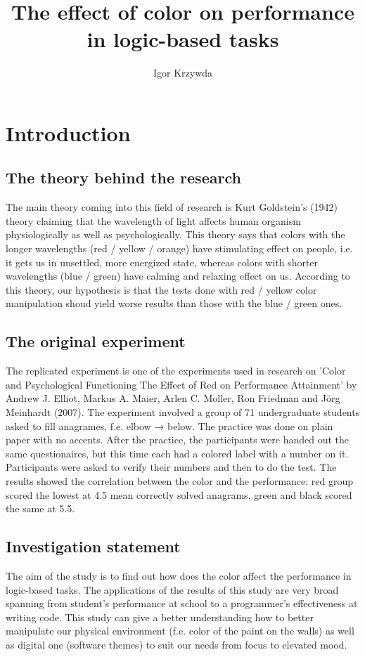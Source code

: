 \documentclass{article}
\title{The effect of color on performance in logic-based tasks}
\author{Igor Krzywda}
\begin{document}
\maketitle

\section*{Introduction}

\subsection*{The theory behind the research}
	The main theory coming into this field of research is Kurt Goldstein's (1942) theory claiming that
	the wavelength of light affects human organism physiologically as well as psychologically. This theory
	says that colors with the longer wavelengths (red / yellow / orange) have stimulating effect on people, 
	i.e. it gets us in unsettled, more energized state, whereas colors with shorter wavelengths (blue / green)
	have calming and relaxing effect on us. According to this theory, our hypothesis is that the tests done
	with red / yellow color manipulation shoud yield worse results than those with the blue / green ones.

\subsection*{The original experiment}
	The replicated experiment is one of the experiments used in research on 'Color and Psychological Functioning
	The Effect of Red on Performance Attainment' by Andrew J. Elliot, Markus A. Maier, Arlen C. Moller, 
	Ron Friedman and Jörg Meinhardt (2007). The experiment involved a group of 71 undergraduate students
	asked to fill anagrames, f.e. elbow → below. The practice was done on plain paper with no accents. After 
	the practice, the participants were handed out the same questionaires, but this time each had a colored
	label with a number on it. Participants were asked to verify their numbers and then to do the test. The 
	results showed the correlation between the color and the performance: red group scored the lowest at 4.5
	mean correctly solved anagrams, green and black scored the same at 5.5. 

\subsection*{Investigation statement}
	The aim of the study is to find out how does the color affect the performance in logic-based tasks. 
	The applications of the results of this study are very broad spanning from student's performance at
	school to a programmer's effectiveness at writing code. This study can give a better understanding how 
	to better manipulate our physical environment (f.e. color of the paint on the walls) as well as digital one
	(software themes) to suit our needs from focus to elevated mood.
\end{document}
